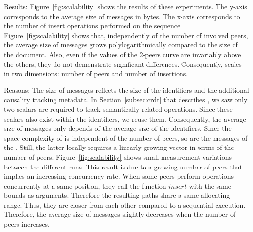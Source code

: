 \begin{asparadesc}
\item [Results:] Figure~\ref{fig:scalability} shows the results of these
  experiments. The y-axis corresponds to the average size of messages in
  bytes. The x-axis corresponds to the number of insert operations performed on
  the sequence. Figure~\ref{fig:scalability} shows that, independently of the
  number of involved peers, the average size of messages grows
  polylogarithmically compared to the size of the document. Also, even if the
  values of the 2-peers curve are invariably above the others, they do not
  demonstrate significant differences. Consequently, \EDITORNAME{} scales in
  two dimensions: number of peers and number of insertions.
\item [Reasons:] The size of messages reflects the size of the identifiers and
  the additional causality tracking metadata. In Section~\ref{subsec:crdt} that
  describes \EDITORNAME{}, we saw only two scalars are required to track
  semantically related operations. Since these scalars also exist within the
  identifiers, we reuse them. Consequently, the average size of messages only
  depends of the average size of the identifiers. Since the space complexity of
  \NAME{} is independent of the number of peers, so are the messages of the
  \EDITORNAME{}. Still, the latter locally requires a linearly growing vector
  in terms of the number of peers. Figure~\ref{fig:scalability} shows small
  measurement variations between the different runs. This result is due to a
  growing number of peers that implies an increasing concurrency rate. When
  some peers perform operations concurrently at a same position, they call the
  function $insert$ with the same bounds as arguments. Therefore the resulting
  paths share a same allocating range. Thus, they are closer from each other
  compared to a sequential execution. Therefore, the average size of messages
  slightly decreases when the number of peers increases.
\end{asparadesc}

